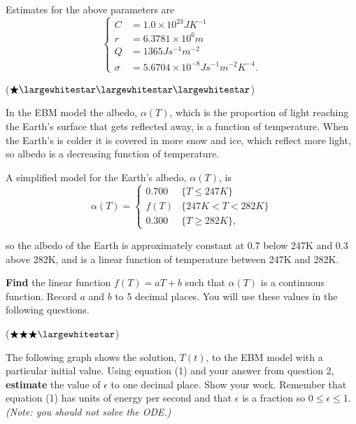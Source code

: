 \documentclass[answers]{exam}
\begin{document}
Estimates for the above parameters are
$$
\begin{cases}
    C & = 1.0 \times 10^{23} J K^{-1} \\
    r & = 6.3781 \times 10^{6}m \\
    Q & = 1365 J s^{-1} m^{-2} \\
    \sigma &= 5.6704 \times 10^{-8} J s^{-1} m^{-2} K^{-4}.
\end{cases}
$$



\begin{questions}
    
\question ($\bigstar \largewhitestar \largewhitestar \largewhitestar$) 

In the EBM model the albedo, $\alpha(T)$,  which is the proportion of light reaching the Earth's surface that gets reflected away,
is a function of temperature. When the Earth's is colder it is covered in more snow and ice, which reflect more light, so albedo is a decreasing function of temperature.

A simplified model for the Earth's albedo, $\alpha(T)$, is
    $$
    \alpha(T) =
    \begin{cases}
    0.700 & \{T \leq 247K\} \\
    f(T) & \{247K < T < 282K\} \\
    0.300 & \{T \geq 282K\},
    \end{cases}
    $$

so the albedo of the Earth is approximately constant at 0.7 below 247K and 0.3 above 282K, and is a linear function of temperature between 247K and 282K.
    
    \textbf{Find} the linear function $f(T) = aT + b$ such that $\alpha(T)$ is a continuous function. Record $a$ and $b$ to 5 decimal places. You will use these values in the following questions.

\question ($\bigstar \bigstar \bigstar \largewhitestar$)

The following graph shows the solution, $T(t)$, to the EBM model  with a particular initial value. Using equation (1) and your answer from question 2, \textbf{estimate} the value of $\epsilon$ to one decimal place. Show your work. Remember that equation (1) has units of energy per second and that $\epsilon$ is a fraction so $0\leq \epsilon \leq 1$. \textit{(Note: you should not solve the ODE.)}


\end{questions}
\end{document}
